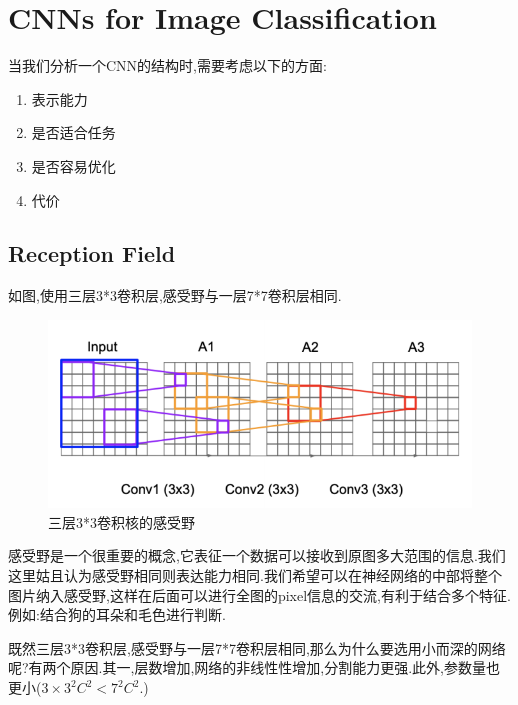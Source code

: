 \section{CNNs for Image Classification}
当我们分析一个CNN的结构时,需要考虑以下的方面:
\begin{enumerate}
	\item 表示能力
	\item 是否适合任务
	\item 是否容易优化
	\item 代价
\end{enumerate}
\subsection{Reception Field}

如图,使用三层3*3卷积层,感受野与一层7*7卷积层相同.
\begin{figure}[htbp]
	\centering
	\includegraphics[scale=0.85]{figures/receptivefield.png}
	\caption{三层3*3卷积核的感受野}
	\label{}
\end{figure}

感受野是一个很重要的概念,它表征一个数据可以接收到原图多大范围的信息.我们这里姑且认为感受野相同则表达能力相同.我们希望可以在神经网络的中部将整个图片纳入感受野,这样在后面可以进行全图的pixel信息的交流,有利于结合多个特征.例如:结合狗的耳朵和毛色进行判断.

既然三层3*3卷积层,感受野与一层7*7卷积层相同,那么为什么要选用小而深的网络呢?有两个原因.其一,层数增加,网络的非线性性增加,分割能力更强.此外,参数量也更小($3\times 3^2 C^2 < 7^2C^2$.)